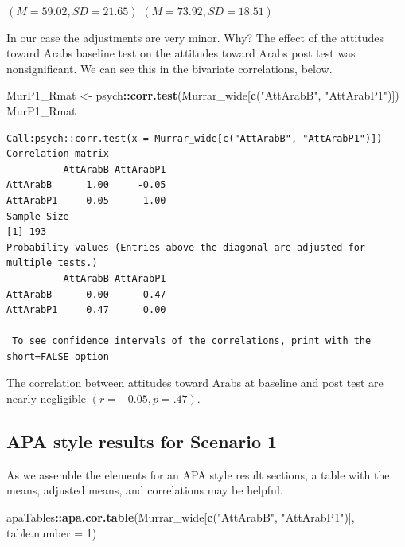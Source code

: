 \documentclass[
  11pt,
]{book}
\newenvironment{Shaded}{\begin{snugshade}}{\end{snugshade}}
\newcommand{\AttributeTok}[1]{\textcolor[rgb]{0.27,0.27,0.27}{#1}}
\newcommand{\DecValTok}[1]{\textcolor[rgb]{0.06,0.06,0.06}{#1}}
\newcommand{\FunctionTok}[1]{\textcolor[rgb]{0.27,0.27,0.27}{\textbf{#1}}}
\newcommand{\NormalTok}[1]{#1}
\newcommand{\OtherTok}[1]{\textcolor[rgb]{0.37,0.37,0.37}{#1}}
\newcommand{\SpecialCharTok}[1]{\textcolor[rgb]{0.43,0.43,0.43}{\textbf{#1}}}
\newcommand{\StringTok}[1]{\textcolor[rgb]{0.5,0.5,0.5}{#1}}
\begin{document}
\((M = 59.02, SD = 21.65)\) \((M = 73.92, SD = 18.51)\)

In our case the adjustments are very minor. Why? The effect of the attitudes toward Arabs baseline test on the attitudes toward Arabs post test was nonsignificant. We can see this in the bivariate correlations, below.

\begin{Shaded}
\begin{Highlighting}[]
\NormalTok{MurP1\_Rmat }\OtherTok{\textless{}{-}}\NormalTok{ psych}\SpecialCharTok{::}\FunctionTok{corr.test}\NormalTok{(Murrar\_wide[}\FunctionTok{c}\NormalTok{(}\StringTok{"AttArabB"}\NormalTok{, }\StringTok{"AttArabP1"}\NormalTok{)])}
\NormalTok{MurP1\_Rmat}
\end{Highlighting}
\end{Shaded}

\begin{verbatim}
Call:psych::corr.test(x = Murrar_wide[c("AttArabB", "AttArabP1")])
Correlation matrix 
          AttArabB AttArabP1
AttArabB      1.00     -0.05
AttArabP1    -0.05      1.00
Sample Size 
[1] 193
Probability values (Entries above the diagonal are adjusted for multiple tests.) 
          AttArabB AttArabP1
AttArabB      0.00      0.47
AttArabP1     0.47      0.00

 To see confidence intervals of the correlations, print with the short=FALSE option
\end{verbatim}

The correlation between attitudes toward Arabs at baseline and post test are nearly negligible \((r = -0.05, p = .47)\).

\hypertarget{apa-style-results-for-scenario-1}{%
\subsection{APA style results for Scenario 1}\label{apa-style-results-for-scenario-1}}

As we assemble the elements for an APA style result sections, a table with the means, adjusted means, and correlations may be helpful.

\begin{Shaded}
\begin{Highlighting}[]
\NormalTok{apaTables}\SpecialCharTok{::}\FunctionTok{apa.cor.table}\NormalTok{(Murrar\_wide[}\FunctionTok{c}\NormalTok{(}\StringTok{"AttArabB"}\NormalTok{, }\StringTok{"AttArabP1"}\NormalTok{)], }\AttributeTok{table.number =} \DecValTok{1}\NormalTok{)}
\end{Highlighting}
\end{Shaded}
\end{document}
